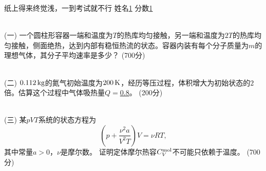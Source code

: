\documentclass[12pt,CJK]{article}
\def\mark#1{{\color{blue} (#1分)}}
\begin{document}
\bch


{\blue 纸上得来终觉浅，一到考试就不行} {} 姓名\uline{1} {\hskip 0.5in} 分数\uline{1}

{\vskip 0.3in}
\ \\
(一) 一个圆柱形容器一端和温度为$T$的热库均匀接触，另一端和温度为$2T$的热库均匀接触，侧面绝热，达到内部有稳恒热流的状态。容器内装有每个分子质量为$m$的理想气体，其分子平均速率是多少？ \mark{700}
\emini
{}
\emini

{\vskip 3in}

\ \\
(二) $0.112\,\mathrm{kg}$的氮气初始温度为$200\,\mathrm{K}$，经历等压过程，体积增大为初始状态的$2$倍。估算这个过程中气体吸热量$Q=$\uline{0.8}。 \mark{200}

{\vskip 0.1in}
\ \\
(三) 某$pVT$系统的状态方程为
$$\left(p+\frac{\nu^2 a}{V^2T}\right)V = \nu R T,$$
其中常量$a>0$，$\nu$是摩尔数。 证明定体摩尔热容$C_V^{\rm mol}$不可能只依赖于温度。 \mark{700}



\ech
\end{document}
